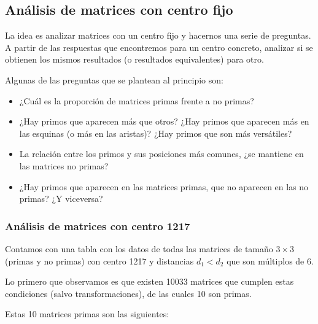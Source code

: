 
\newcommand{\red}[1]{\textbf{\textcolor{mutedred}{#1}}}
\newcommand{\blue}[1]{\textbf{\textcolor{lightblue}{#1}}}

\newcommand{\question}[1]{\noindent\hspace*{1em}\textbf{#1}}



\subsection{Análisis de matrices con centro fijo}

La idea es analizar matrices con un centro fijo y hacernos una serie de preguntas. A partir de las respuestas que encontremos para un centro concreto, analizar si se obtienen los mismos resultados (o resultados equivalentes) para otro.

Algunas de las preguntas que se plantean al principio son:

\begin{itemize}
    \item ¿Cuál es la proporción de matrices primas frente a no primas?
    \item ¿Hay primos que aparecen más que otros? ¿Hay primos que aparecen más en las esquinas (o más en las aristas)? ¿Hay primos que son más versátiles?
    \item La relación entre los primos y sus posiciones más comunes, ¿se mantiene en las matrices no primas?
    \item ¿Hay primos que aparecen en las matrices primas, que no aparecen en las no primas? ¿Y viceversa?
\end{itemize}

\subsubsection{Análisis de matrices con centro 1217}

Contamos con una tabla con los datos de todas las matrices de tamaño $3\times3$ (primas y no primas) con centro 1217 y distancias $d_1 < d_2$ que son múltiplos de 6.

Lo primero que observamos es que existen 10033 matrices que cumplen estas condiciones (salvo transformaciones), de las cuales 10 son primas.

Estas 10 matrices primas son las siguientes:

